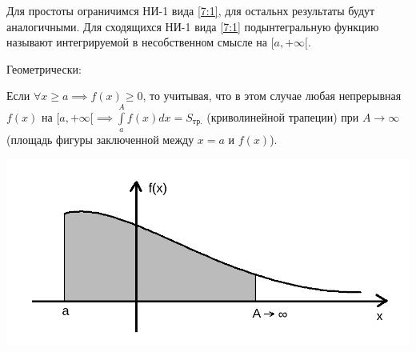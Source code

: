 \documentclass[../../main.tex]{subfiles}
\begin{document}
Для простоты ограничимся НИ-1 вида \eqref{7:1}, для остальнх результаты будут
аналогичными. Для сходящихся НИ-1 вида \eqref{7:1} подынтегральную функцию 
называют интегрируемой в несобственном смысле на $[a, +\infty[$.

Геометрически:

Если $\forall x \geq a \implies f(x) \geq 0$, то учитывая, что в этом
случае любая непрерывная $f(x)$ на $[a, +\infty[ \implies
\int\limits_a^A f(x)dx = S_{\text{тр.}}$ (криволинейной трапеции) при
$A \to \infty$ (площадь фигуры заключенной между $x = a$ и $f(x)$).

\includegraphics[scale = 0.3]{lec7_1.png}
\end{document}
